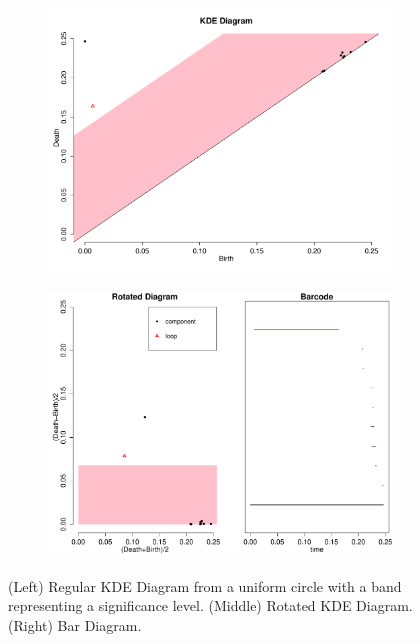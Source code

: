 \documentclass[a4paper]{article}
\begin{document}
\begin{figure}[htp!]
\centering
\begin{subfigure}{.5\textwidth}
  \centering
  \includegraphics[width=\linewidth]{KDEweek2}
\end{subfigure}%
\begin{subfigure}{.5\textwidth}
  \centering
  \includegraphics[width=\linewidth]{rotatedKDE}
\end{subfigure}
\caption{(Left) Regular KDE Diagram from a uniform circle with a band representing a significance level. (Middle) Rotated KDE Diagram. (Right) Bar Diagram.}
\end{figure}
\end{document}
